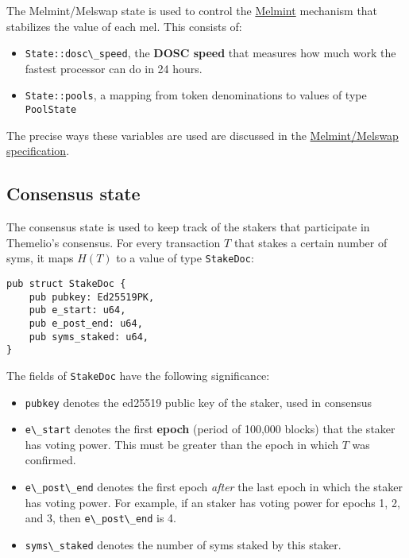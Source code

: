 \documentclass[
]{article}
\newcommand{\passthrough}[1]{#1}
\providecommand{\tightlist}{%
  \setlength{\itemsep}{0pt}\setlength{\parskip}{0pt}}
\begin{document}
The Melmint/Melswap state is used to control the
\href{/specifications/tech-melmint}{Melmint} mechanism that stabilizes
the value of each mel. This consists of:

\begin{itemize}
  \tightlist
  \item
        \passthrough{\lstinline!State::dosc\_speed!}, the \textbf{DOSC speed}
        that measures how much work the fastest processor can do in 24 hours.
  \item
        \passthrough{\lstinline!State::pools!}, a mapping from token
        denominations to values of type \passthrough{\lstinline!PoolState!}
\end{itemize}

The precise ways these variables are used are discussed in the
\href{/specifications/tech-melmint}{Melmint/Melswap specification}.

\hypertarget{consensus-state}{%
  \subsection{Consensus state}\label{consensus-state}}

The consensus state is used to keep track of the stakers that
participate in Themelio's consensus. For every transaction \(T\) that
stakes a certain number of syms, it maps \(H(T)\) to a value of type
\passthrough{\lstinline!StakeDoc!}:

\begin{lstlisting}
pub struct StakeDoc {
    pub pubkey: Ed25519PK,
    pub e_start: u64,
    pub e_post_end: u64,
    pub syms_staked: u64,
}
\end{lstlisting}

The fields of \passthrough{\lstinline!StakeDoc!} have the following
significance:

\begin{itemize}
  \tightlist
  \item
        \passthrough{\lstinline!pubkey!} denotes the ed25519 public key of the
        staker, used in consensus
  \item
        \passthrough{\lstinline!e\_start!} denotes the first \textbf{epoch}
        (period of 100,000 blocks) that the staker has voting power. This must
        be greater than the epoch in which \(T\) was confirmed.
  \item
        \passthrough{\lstinline!e\_post\_end!} denotes the first epoch
        \emph{after} the last epoch in which the staker has voting power. For
        example, if an staker has voting power for epochs 1, 2, and 3, then
        \passthrough{\lstinline!e\_post\_end!} is 4.
  \item
        \passthrough{\lstinline!syms\_staked!} denotes the number of syms
        staked by this staker.
\end{itemize}
\end{document}
